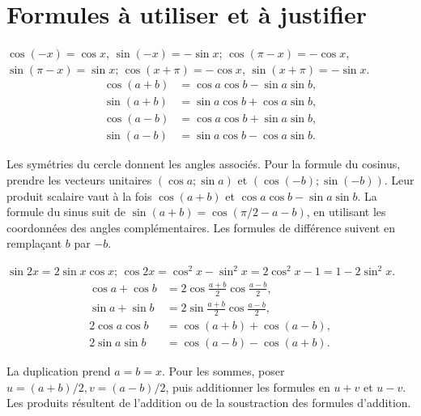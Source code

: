 \section{Formules à utiliser et à justifier}
\begin{propriete}
$\cos(-x)=\cos x$, $\sin(-x)=-\sin x$;
$\cos(\pi-x)=-\cos x$, $\sin(\pi-x)=\sin x$;
$\cos(x+\pi)=-\cos x$, $\sin(x+\pi)=-\sin x$.
\[
\begin{aligned}
\cos(a+b)&=\cos a\cos b-\sin a\sin b,\\
\sin(a+b)&=\sin a\cos b+\cos a\sin b,\\
\cos(a-b)&=\cos a\cos b+\sin a\sin b,\\
\sin(a-b)&=\sin a\cos b-\cos a\sin b.
\end{aligned}
\]
\end{propriete}
\begin{demonstration}Les symétries du cercle donnent les angles associés. Pour la formule du cosinus, prendre les vecteurs unitaires $(\cos a;\sin a)$ et $(\cos(-b);\sin(-b))$. Leur produit scalaire vaut à la fois $\cos(a+b)$ et $\cos a\cos b-\sin a\sin b$. La formule du sinus suit de $\sin(a+b)=\cos(\pi/2-a-b)$, en utilisant les coordonnées des angles complémentaires. Les formules de différence suivent en remplaçant $b$ par $-b$.\end{demonstration}
\begin{propriete}
$\sin2x=2\sin x\cos x$;
$\cos2x=\cos^2x-\sin^2x=2\cos^2x-1=1-2\sin^2x$.
\[
\begin{aligned}
\cos a+\cos b&=2\cos\tfrac{a+b}{2}\cos\tfrac{a-b}{2},\\
\sin a+\sin b&=2\sin\tfrac{a+b}{2}\cos\tfrac{a-b}{2},\\
2\cos a\cos b&=\cos(a+b)+\cos(a-b),\\
2\sin a\sin b&=\cos(a-b)-\cos(a+b).
\end{aligned}
\]
\end{propriete}
\begin{demonstration}La duplication prend $a=b=x$. Pour les sommes, poser $u=(a+b)/2,v=(a-b)/2$, puis additionner les formules en $u+v$ et $u-v$. Les produits résultent de l’addition ou de la soustraction des formules d’addition.\end{demonstration}
